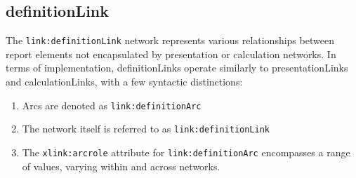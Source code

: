 \subsection{definitionLink}
\label{sec:definitionLink}






The \texttt{link:definitionLink} network represents various relationships between report elements not encapsulated by presentation or calculation networks.  
In terms of implementation, definitionLinks operate similarly to presentationLinks and calculationLinks,  
with a few syntactic distinctions:

\begin{enumerate}  
    \item Arcs are denoted as \texttt{link:definitionArc}  
    \item The network itself is referred to as \texttt{link:definitionLink}  
    \item The \texttt{xlink:arcrole} attribute for \texttt{link:definitionArc} encompasses a range of values, varying within and across networks. 
\end{enumerate}  

